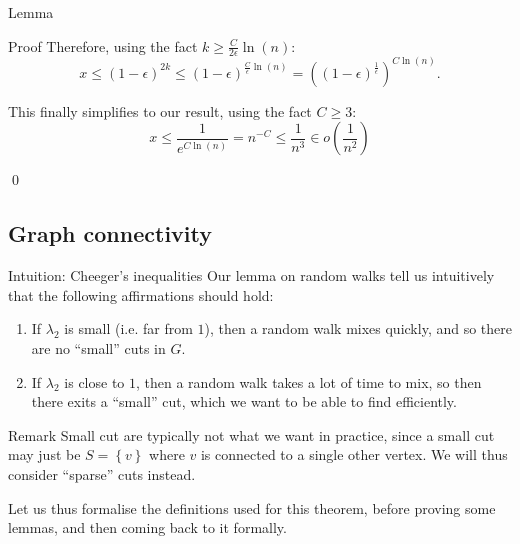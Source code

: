 \documentclass[a4paper]{article}
\begin{document}
\begin{parag}{Lemma}
\begin{subparag}{Proof}
        Therefore, using the fact $k \geq \frac{C}{2\epsilon} \ln\left(n\right)$:
        \[x \leq \left(1 - \epsilon\right)^{2k} \leq \left(1 - \epsilon\right)^{\frac{C}{\epsilon} \ln\left(n\right)} = \left(\left(1 - \epsilon\right)^{\frac{1}{\epsilon}}\right)^{C \ln\left(n\right)}.\]
        
        This finally simplifies to our result, using the fact $C \geq 3$: 
        \[x \leq \frac{1}{e^{C \ln\left(n\right)}} = n^{-C} \leq \frac{1}{n^3} \in o\left(\frac{1}{n^2}\right)\]
        
        \qed
    \end{subparag}
\end{parag}

\subsection{Graph connectivity}

\begin{parag}{Intuition: Cheeger's inequalities}
    Our lemma on random walks tell us intuitively that the following affirmations should hold:
    \begin{enumerate}
        \item If $\lambda_2$ is small (i.e. far from $1$), then a random walk mixes quickly, and so there are no ``small'' cuts in $G$.
        \item If $\lambda_2$ is close to $1$, then a random walk takes a lot of time to mix, so then there exits a ``small'' cut, which we want to be able to find efficiently.
    \end{enumerate}
    
    \begin{subparag}{Remark}
        Small cut are typically not what we want in practice, since a small cut may just be $S = \left\{v\right\}$ where $v$ is connected to a single other vertex. We will thus consider ``sparse'' cuts instead.

        Let us thus formalise the definitions used for this theorem, before proving some lemmas, and then coming back to it formally.
    \end{subparag}
\end{parag}
\end{document}
